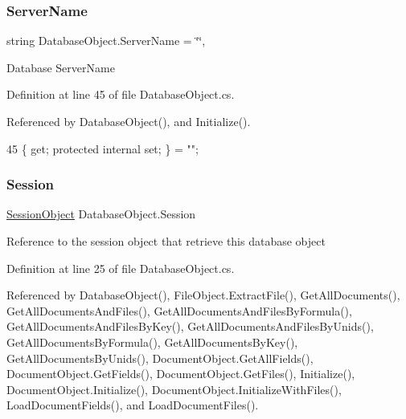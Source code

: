 \subsubsection{\texorpdfstring{Server\+Name}{ServerName}}
{\footnotesize\ttfamily string Database\+Object.\+Server\+Name = \char`\"{}\char`\"{}\hspace{0.3cm}{\ttfamily [get]}, {\ttfamily [set]}}



Database Server\+Name 



Definition at line 45 of file Database\+Object.\+cs.



Referenced by Database\+Object(), and Initialize().


\begin{DoxyCode}
45 \{ \textcolor{keyword}{get}; \textcolor{keyword}{protected} \textcolor{keyword}{internal} \textcolor{keyword}{set}; \} = \textcolor{stringliteral}{""};
\end{DoxyCode}
\mbox{\label{class_database_object_aa8484162b7d2a7c4c9426bca13c64c07}} 
\subsubsection{\texorpdfstring{Session}{Session}}
{\footnotesize\ttfamily \mbox{\hyperlink{class_session_object}{Session\+Object}} Database\+Object.\+Session\hspace{0.3cm}{\ttfamily [get]}}



Reference to the session object that retrieve this database object 



Definition at line 25 of file Database\+Object.\+cs.



Referenced by Database\+Object(), File\+Object.\+Extract\+File(), Get\+All\+Documents(), Get\+All\+Documents\+And\+Files(), Get\+All\+Documents\+And\+Files\+By\+Formula(), Get\+All\+Documents\+And\+Files\+By\+Key(), Get\+All\+Documents\+And\+Files\+By\+Unids(), Get\+All\+Documents\+By\+Formula(), Get\+All\+Documents\+By\+Key(), Get\+All\+Documents\+By\+Unids(), Document\+Object.\+Get\+All\+Fields(), Document\+Object.\+Get\+Fields(), Document\+Object.\+Get\+Files(), Initialize(), Document\+Object.\+Initialize(), Document\+Object.\+Initialize\+With\+Files(), Load\+Document\+Fields(), and Load\+Document\+Files().


